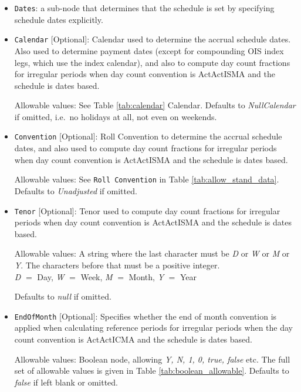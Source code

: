 \begin{itemize}

\item \lstinline!Dates!: a sub-node that determines that the schedule is set by specifying schedule dates explicitly. 

\item \lstinline!Calendar! [Optional]: Calendar used to determine the accrual schedule dates. Also used to determine payment dates (except for compounding OIS index legs, which use the index calendar), and also to compute day count fractions for irregular periods when day count convention is ActActISMA and the schedule is dates based. 

Allowable values: See Table \ref{tab:calendar} Calendar. Defaults to \emph{NullCalendar} if omitted, i.e.\ no holidays at all, not even on weekends.

\item \lstinline!Convention! [Optional]: Roll Convention to determine the accrual schedule dates, and also used to compute day count fractions for irregular periods when day count convention is ActActISMA and the schedule is dates based.

Allowable values: See \lstinline!Roll Convention! in Table
\ref{tab:allow_stand_data}. Defaults to \emph{Unadjusted} if omitted.

\item \lstinline!Tenor! [Optional]: Tenor used to compute day count fractions for irregular periods when day count convention is ActActISMA and the schedule is dates based.

Allowable values: A string where the last character must be \emph{D} or \emph{W} or
\emph{M} or \emph{Y}.  The characters before that must be a positive integer. \\ \emph{D}
$=$ Day, \emph{W} $=$ Week, \emph{M} $=$ Month, \emph{Y} $=$ Year

Defaults to \emph{null} if omitted.

\item \lstinline!EndOfMonth! [Optional]: Specifies whether the end of month convention is applied when calculating reference periods
  for irregular periods when the day count convention is ActActICMA and the schedule is dates based.

Allowable values: Boolean node, allowing \emph{Y, N, 1, 0, true, false} etc. The full set of allowable values is given in Table \ref{tab:boolean_allowable}. Defaults to \emph{false} if left blank or omitted.


\end{itemize}
